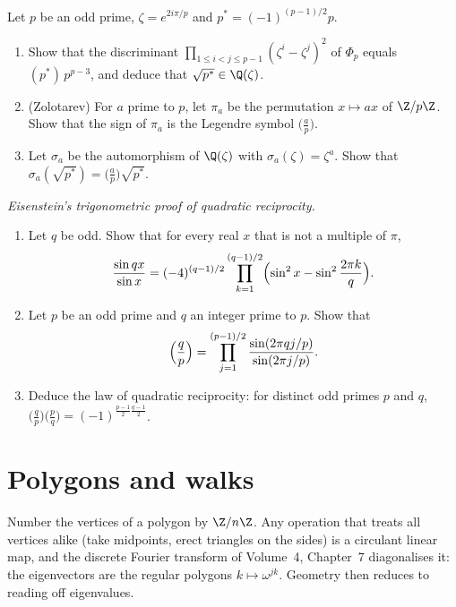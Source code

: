 \begin{exercise}[$\star\star\star$]\label{pb:discphi}
Let $p$ be an odd prime, $\zeta=e^{2i\pi/p}$ and $p^*=(-1)^{(p-1)/2}p$.
\begin{enumerate}[label=(\alph*)]
\item Show that the discriminant $\prod_{1\le i<j\le p-1}(\zeta^i-\zeta^j)^2$ of $\Phi_p$ equals $(p^*)\,p^{p-3}$, and
deduce that $\sqrt{p^*}\in\Q(\zeta)$.
\item (Zolotarev) For $a$ prime to $p$, let $\pi_a$ be the permutation $x\mapsto ax$ of $\Z/p\Z$. Show that the sign of
$\pi_a$ is the Legendre symbol $\bigl(\frac ap\bigr)$.
\item Let $\sigma_a$ be the automorphism of $\Q(\zeta)$ with $\sigma_a(\zeta)=\zeta^a$. Show that
$\sigma_a(\sqrt{p^*})=\bigl(\frac ap\bigr)\sqrt{p^*}$.
\end{enumerate}
\end{exercise}

\begin{exercise}[Journey]\label{pb:eisensine}
\emph{Eisenstein's trigonometric proof of quadratic reciprocity.}
\begin{enumerate}[label=(\alph*)]
\item Let $q$ be odd. Show that for every real $x$ that is not a multiple of $\pi$,
\[
\frac{\sin qx}{\sin x}=(-4)^{(q-1)/2}\prod_{k=1}^{(q-1)/2}\Bigl(\sin^2x-\sin^2\frac{2\pi k}q\Bigr).
\]
\item Let $p$ be an odd prime and $q$ an integer prime to $p$. Show that
\[
\Bigl(\frac qp\Bigr)=\prod_{j=1}^{(p-1)/2}\frac{\sin(2\pi qj/p)}{\sin(2\pi j/p)}.
\]
\item Deduce the law of quadratic reciprocity: for distinct odd primes $p$ and $q$,
$\bigl(\frac qp\bigr)\bigl(\frac pq\bigr)=(-1)^{\frac{p-1}2\frac{q-1}2}$.
\end{enumerate}
\end{exercise}

\section{Polygons and walks}

Number the vertices of a polygon by $\Z/n\Z$. Any operation that treats all vertices alike (take midpoints, erect triangles
on the sides) is a circulant linear map, and the discrete Fourier transform of Volume~4, Chapter~7 diagonalises it: the
eigenvectors are the regular polygons $k\mapsto\omega^{jk}$. Geometry then reduces to reading off eigenvalues.

